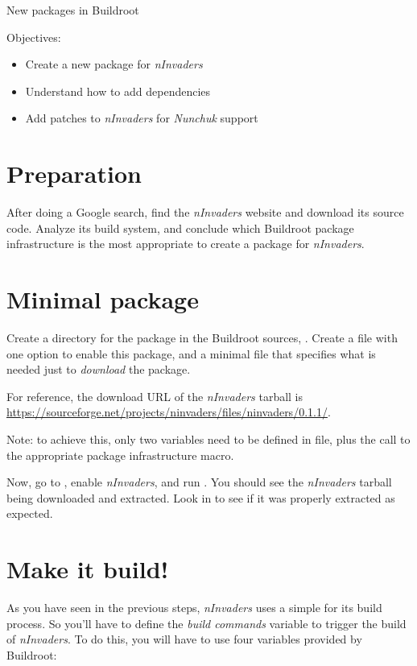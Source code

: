 \subchapter
{New packages in Buildroot}
{Objectives:
  \begin{itemize}
  \item Create a new package for {\em nInvaders}
  \item Understand how to add dependencies
  \item Add patches to {\em nInvaders} for {\em Nunchuk} support
  \end{itemize}
}

\section{Preparation}

After doing a Google search, find the {\em nInvaders} website and
download its source code. Analyze its build system, and conclude which
Buildroot package infrastructure is the most appropriate to create a
package for {\em nInvaders}.

\section{Minimal package}

Create a directory for the package in the Buildroot sources,
. Create a  file with one
option to enable this package, and a minimal  file
that specifies what is needed just to {\em download} the package.

For reference, the download URL of the {\em nInvaders} tarball is
\url{https://sourceforge.net/projects/ninvaders/files/ninvaders/0.1.1/}.

Note: to achieve this, only two variables need to be defined in
 file, plus the call to the appropriate package
infrastructure macro.

Now, go to , enable {\em nInvaders}, and run
. You should see the {\em nInvaders} tarball being
downloaded and extracted. Look in  to see if it
was properly extracted as expected.

\section{Make it build!}

As you have seen in the previous steps, {\em nInvaders} uses a simple
 for its build process. So you'll have to define the
{\em build commands} variable to trigger the build of {\em
  nInvaders}. To do this, you will have to use four variables provided
by Buildroot:

